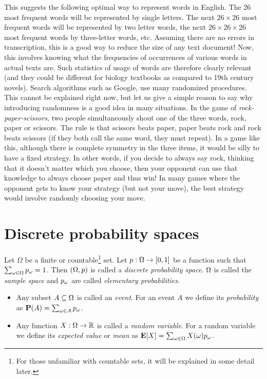 \documentclass[preprint,  11pt]{amsart}
\begin{document}
This suggests the following optimal way to represent words in English. The 26 most frequent words will be represented by single letters. The next $26\times 26$ most frequent words will be represented by two letter words, the next $26\times 26\times 26$ most frequent words by three-letter words, etc. Assuming there are no errors in transcription, this is a good way to reduce the size of any text document! Now, this involves knowing what the frequencies of occurrences of various words in actual texts are. Such statistics of usage of words are therefore clearly relevant (and they could be different for biology textbooks as compared to 19th century novels). 
\eeg
\beg Search algorithms such as Google, use many randomized procedures. This cannot be explained right now, but let us give a simple reason to say why introducing randomness is a good idea in many situations. In the game of {\em rock-paper-scissors}, two people simultaneously shout one of the three words, rock, paper or scissors. The rule is that scissors beats paper, paper beats rock and rock beats scissors (if they both call the same word, they must repeat). In a game like this, although there is complete symmetry in the three items, it would be silly to have a fixed strategy. In other words, if you decide to always say rock, thinking that it doesn't matter which you choose, then your opponent can use that knowledge to always choose paper and thus win! In many games where the opponent gets to know your strategy (but not your move), the best strategy would involve  randomly choosing your move.
\eeg


\section{Discrete probability spaces}
\begin{definition} Let $\Omega$ be a finite or countable\footnote{For those unfamiliar with countable sets, it will be explained in some detail later.} set. Let $p:\Omega\rightarrow [0,1]$ be a function such that $\sum_{\omega\in \Omega}p_{\omega}=1$. Then $(\Omega,p)$ is called a {\em discrete probability space}. $\Omega$ is called the {\em sample space} and $p_{\omega}$ are called {\em elementary probabilities}. 
\begin{itemize}
\item Any subset $A\subseteq \Omega$ is called an {\em event}. For an event $A$ we define its {\em probability} as $\mathbf{P}(A)=\sum_{\omega\in A}p_{\omega}$.
\item Any function $X:\Omega\rightarrow \mathbb{R}$ is called a {\em random variable}.  For a random variable we define its {\em expected value} or {\em mean} as $\mathbf{E}[X]=\sum_{\omega \in \Omega}X(\omega)p_{\omega}$.
\end{itemize}
\end{definition}
\end{document}
